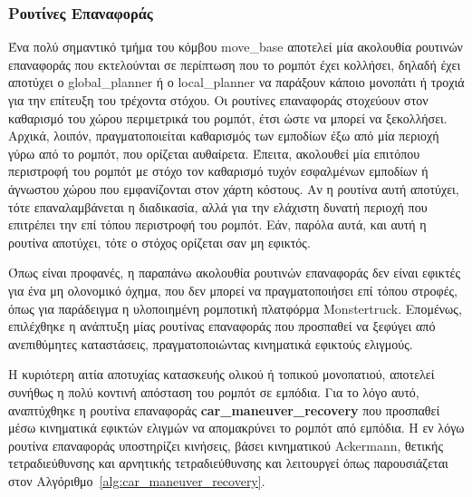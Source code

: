 \subsubsection{Ρουτίνες Επαναφοράς}
Ένα πολύ σημαντικό τμήμα του κόμβου move{\_}base αποτελεί μία ακολουθία ρουτινών επαναφοράς που εκτελούνται σε περίπτωση που το ρομπότ έχει κολλήσει, δηλαδή έχει αποτύχει ο global{\_}planner ή ο local{\_}planner να παράξουν κάποιο μονοπάτι ή τροχιά για την επίτευξη του τρέχοντα στόχου. Οι ρουτίνες επαναφοράς στοχεύουν στον καθαρισμό του χώρου περιμετρικά του ρομπότ, έτσι ώστε να μπορεί να ξεκολλήσει. Αρχικά, λοιπόν, πραγματοποιείται καθαρισμός των εμποδίων έξω από μία περιοχή γύρω από το ρομπότ, που ορίζεται αυθαίρετα. Έπειτα, ακολουθεί μία επιτόπου περιστροφή του ρομπότ με στόχο τον καθαρισμό τυχόν εσφαλμένων εμποδίων ή άγνωστου χώρου που εμφανίζονται στον χάρτη κόστους. Αν η ρουτίνα αυτή αποτύχει, τότε επαναλαμβάνεται η διαδικασία, αλλά για την ελάχιστη δυνατή περιοχή που επιτρέπει την επί τόπου περιστροφή του ρομπότ. Εάν, παρόλα αυτά, και αυτή η ρουτίνα αποτύχει, τότε ο στόχος ορίζεται σαν μη εφικτός.

\bigskip
Όπως είναι προφανές, η παραπάνω ακολουθία ρουτινών επαναφοράς δεν είναι εφικτές για ένα μη ολονομικό όχημα, που δεν μπορεί να πραγματοποιήσει επί τόπου στροφές, όπως για παράδειγμα η υλοποιημένη ρομποτική πλατφόρμα Monstertruck. Επομένως, επιλέχθηκε η ανάπτυξη μίας ρουτίνας επαναφοράς που προσπαθεί να ξεφύγει από ανεπιθύμητες καταστάσεις, πραγματοποιώντας κινηματικά εφικτούς ελιγμούς.

\bigskip
Η κυριότερη αιτία αποτυχίας κατασκευής ολικού ή τοπικού μονοπατιού, αποτελεί συνήθως η πολύ κοντινή απόσταση του ρομπότ σε εμπόδια. Για το λόγο αυτό, αναπτύχθηκε η ρουτίνα επαναφοράς \textbf{car{\_}maneuver{\_}recovery} που προσπαθεί μέσω κινηματικά εφικτών ελιγμών να απομακρύνει το ρομπότ από εμπόδια. Η εν λόγω ρουτίνα επαναφοράς υποστηρίζει κινήσεις, βάσει κινηματικού Ackermann, θετικής τετραδιεύθυνσης και αρνητικής τετραδιεύθυνσης και λειτουργεί όπως παρουσιάζεται στον Αλγόριθμο~\ref{alg:car_maneuver_recovery}.

